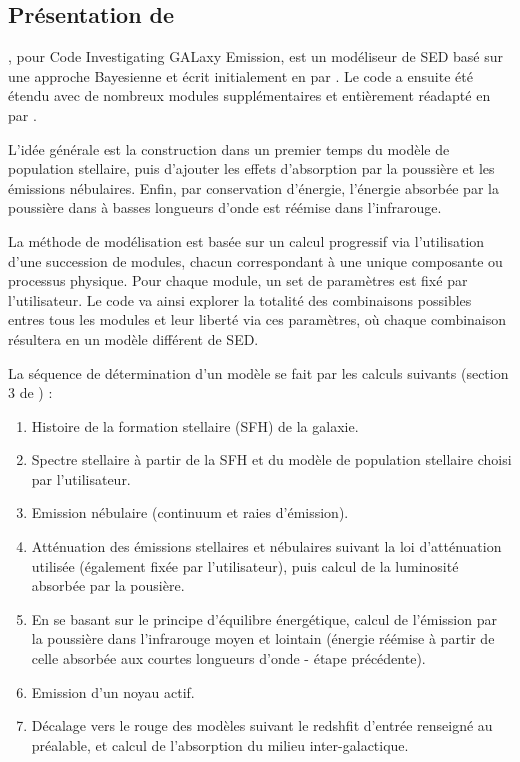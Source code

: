 \documentclass[../main/main.tex]{subfiles}
\begin{document}
\subsection{Présentation de }
\label{ssec:cigale}

, pour Code Investigating GALaxy Emission, est un modéliseur
de SED basé sur une approche Bayesienne et écrit initialement en  par \citet{Noll2009,Burgarella2005}. 
Le code a ensuite été étendu avec de nombreux modules
supplémentaires et
entièrement réadapté en  par \citet{Boquien2019}. 

L'idée générale est la construction dans un premier temps du modèle de
population stellaire, puis d'ajouter les effets d'absorption par la
poussière et les émissions nébulaires. Enfin, par conservation
d'énergie, l'énergie absorbée par la poussière dans à basses longueurs
d'onde est réémise dans l'infrarouge.

La méthode de modélisation est basée sur un calcul progressif via
l'utilisation d'une succession de modules,
chacun correspondant à une unique composante ou processus physique. Pour
chaque module, un set de paramètres est fixé par l'utilisateur. Le code
va ainsi explorer la totalité des combinaisons possibles entres
tous les modules et leur liberté via ces paramètres, où chaque
combinaison résultera en un modèle différent de SED.

La séquence de détermination d'un modèle se fait par les calculs suivants
(section 3 de \citet{Boquien2019}) :

\begin{enumerate}
\item Histoire de la formation stellaire (SFH) de la galaxie.
\item Spectre stellaire à partir de la SFH et du modèle de
  population stellaire choisi par l'utilisateur.
\item Emission nébulaire (continuum et raies d'émission).
\item Atténuation des émissions stellaires et nébulaires suivant la
    loi d'atténuation utilisée (également fixée par l'utilisateur), puis
    calcul de la luminosité absorbée par la pousière.
\item En se basant sur le principe d'équilibre énergétique, calcul de
    l'émission par la poussière dans l'infrarouge  moyen et lointain
    (énergie réémise à partir de celle absorbée aux courtes
    longueurs d'onde - étape précédente).
\item Emission d'un noyau actif.
\item Décalage vers le rouge des modèles suivant le redshfit
      d'entrée renseigné au préalable, et calcul de l'absorption du
      milieu inter-galactique.
  
\end{enumerate}
\end{document}
